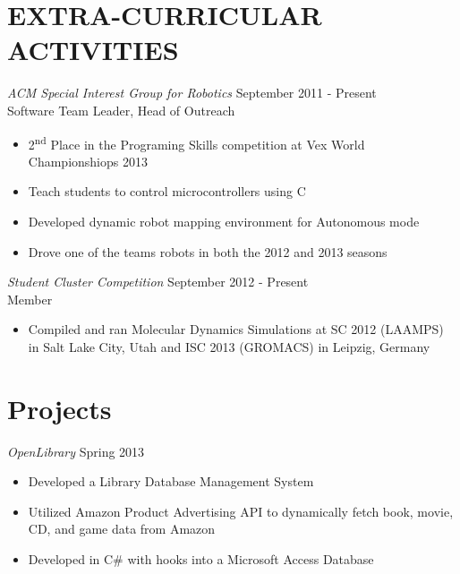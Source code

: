 \documentclass[line,margin]{res}
\begin{document}
\begin{resume}
\section{EXTRA-CURRICULAR \\ ACTIVITIES}
				{\sl ACM Special Interest Group for Robotics} \hfill September 2011 - Present \\
                Software Team Leader, Head of Outreach
                \begin{itemize}  \itemsep -2pt %
                  \item 2\textsuperscript{nd} Place in the Programing Skills competition at Vex World Championshiops 2013
                  \item Teach students to control microcontrollers using C
                  \item Developed dynamic robot mapping environment for Autonomous mode
                  \item Drove one of the teams robots in both the 2012 and 2013 seasons
                \end{itemize}
                
                {\sl Student Cluster Competition} \hfill September 2012 - Present \\
                Member
                \begin{itemize}  \itemsep -2pt %
                  \item Compiled and ran Molecular Dynamics Simulations at SC 2012 (LAAMPS) in Salt Lake City, Utah and ISC 2013 (GROMACS) in Leipzig, Germany
                \end{itemize}
                
\section{Projects}
				{\sl OpenLibrary} \hfill Spring 2013
                \begin{itemize}  \itemsep -2pt %
                  \item Developed a Library Database Management System
                  \item Utilized Amazon Product Advertising API to dynamically fetch book, movie, CD, and game data from Amazon
                  \item Developed in C\# with hooks into a Microsoft Access Database
                \end{itemize}
                

\end{resume}
\end{document}
